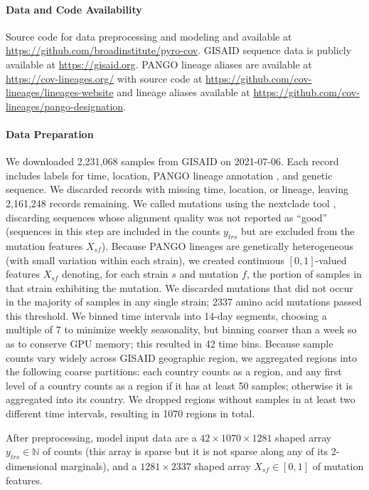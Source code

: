 \documentclass[12pt]{article}
\newcommand \TODO \fbox
\begin{document}
\paragraph*{Data and Code Availability}

Source code for data preprocessing and modeling and available at
\url{https://github.com/broadinstitute/pyro-cov}.
GISAID sequence data is publicly available at
\url{https://gisaid.org}.
PANGO lineage aliases are available at \url{https://cov-lineages.org/} with source code at \url{https://github.com/cov-lineages/lineages-website} and lineage aliases available at \url{https://github.com/cov-lineages/pango-designation}.

\paragraph*{Data Preparation}

We downloaded 2,231,068 samples from GISAID 
\TODO{cite} on 2021-07-06.
Each record includes labels for time, location, PANGO lineage annotation \TODO{cite}, and genetic sequence.
We discarded records with missing time, location, or lineage, leaving 2,161,248 records remaining.
We called mutations using the nextclade tool \cite{aksamentov2020nextclade}, discarding sequences whose alignment quality was not reported as ``good'' (sequences in this step are included in the counts $y_{trs}$ but are excluded from the mutation features $X_{sf}$).
Because PANGO lineages are genetically heterogeneous (with small variation within each strain), we created continuous $[0, 1]$-valued features $X_{sf}$ denoting, for each strain $s$ and mutation $f$, the portion of samples in that strain exhibiting the mutation.
We discarded mutations that did not occur in the majority of samples in any single strain; 2337 amino acid mutations passed this threshold.
We binned time intervals into 14-day segments, choosing a multiple of 7 to minimize weekly seasonality, but binning coarser than a week so as to conserve GPU memory; this resulted in 42 time bins.
Because sample counts vary widely across GISAID geographic region, we aggregated regions into the following coarse partitions: each country counts as a region, and any first level of a country counts as a region if it has at least 50 samples; otherwise it is aggregated into its country.
We dropped regions without samples in at least two different time intervals, resulting in 1070 regions in total.

After preprocessing, model input data are a $42 \times 1070 \times 1281$ shaped array $y_{trs}\in\mathbb N$ of counts (this array is sparse but it is not sparse along any of its 2-dimensional marginals), and a $1281 \times 2337$ shaped array $X_{sf}\in[0,1]$ of mutation features.
\end{document}
